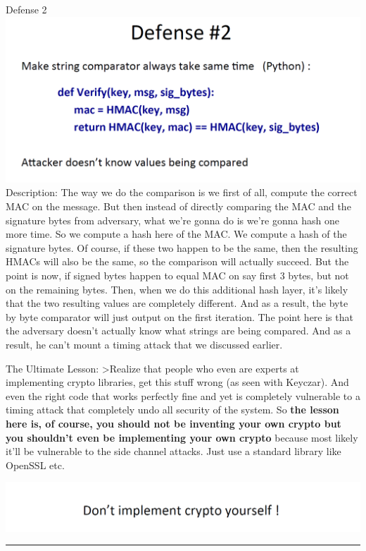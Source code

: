 \documentclass[11pt]{article}
\makeatletter
\def\maxwidth{\ifdim\Gin@nat@width>\linewidth\linewidth
    \else\Gin@nat@width\fi}
\let\Oldincludegraphics\includegraphics
\renewcommand{\includegraphics}[1]{\Oldincludegraphics[width=.8\maxwidth]{#1}}
\makeatother
\begin{document}
Defense 2 \includegraphics{./Images/Defense2-VTA.png} Description: The
way we do the comparison is we first of all, compute the correct MAC on
the message. But then instead of directly comparing the MAC and the
signature bytes from adversary, what we're gonna do is we're gonna hash
one more time. So we compute a hash here of the MAC. We compute a hash
of the signature bytes. Of course, if these two happen to be the same,
then the resulting HMACs will also be the same, so the comparison will
actually succeed. But the point is now, if signed bytes happen to equal
MAC on say first 3 bytes, but not on the remaining bytes. Then, when we
do this additional hash layer, it's likely that the two resulting values
are completely different. And as a result, the byte by byte comparator
will just output on the first iteration. The point here is that the
adversary doesn't actually know what strings are being compared. And as
a result, he can't mount a timing attack that we discussed earlier.

The Ultimate Lesson: \textgreater{}Realize that people who even are
experts at implementing crypto libraries, get this stuff wrong (as seen
with Keyczar). And even the right code that works perfectly fine and yet
is completely vulnerable to a timing attack that completely undo all
security of the system. So \textbf{the lesson here is, of course, you
should not be inventing your own crypto but you shouldn't even be
implementing your own crypto} because most likely it'll be vulnerable to
the side channel attacks. Just use a standard library like OpenSSL etc.

\includegraphics{./Images/UltimateLesson.png}

\begin{center}\rule{0.5\linewidth}{\linethickness}\end{center}
\end{document}
